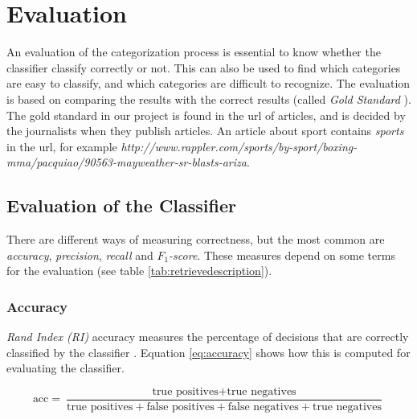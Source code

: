 
\section{Evaluation}
An evaluation of the categorization process is essential to know whether the classifier classify correctly or not. This can also be used to find which categories are easy to classify, and which categories are difficult to recognize. The evaluation is based on comparing the results with the correct results (called \emph{Gold Standard} \cite{wiki:goldstandard}). The gold standard in our project is found in the url of articles, and is decided by the journalists when they publish articles. An article about sport contains \emph{sports} in the url, for example \emph{http://www.rappler.com/sports/by-sport/boxing-mma/pacquiao/90563-mayweather-sr-blasts-ariza}.

\subsection{Evaluation of the Classifier}
There are different ways of measuring correctness, but the most common are \emph{accuracy}, \emph{precision}, \emph{recall} and \emph{$F_{1}$-score}. These measures depend on some terms for the evaluation (see table \ref{tab:retrievedescription}).

\subsubsection{Accuracy}
\emph{Rand Index (RI)} accuracy measures the percentage of decisions that are correctly classified by the classifier \cite[p:~330]{iirbook}. Equation \ref{eq:accuracy} \cite{wiki:accuracy} shows how this is computed for evaluating the classifier. 

\begin{equation} \label{eq:accuracy}
\text{acc}=\frac{\text{true positives}+\text{true negatives}}{\text{true positives}+\text{false positives} + \text{false negatives} + \text{true negatives}}
\end{equation}

